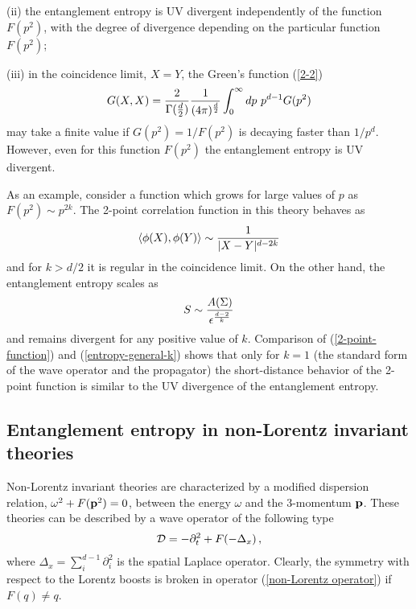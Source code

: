\documentclass[12pt]{article}
\def\be{\begin{eqnarray}}
\def\ee{\end{eqnarray}}
\def\lb{\label}
\def\o{\over}
\begin{document}
\medskip
 
\noindent (ii) the entanglement entropy is UV divergent independently of the function $F(p^2)$, with the degree of divergence 
depending on the particular function $F(p^2)$;

\medskip

\noindent (iii) in the coincidence limit, $X=Y$, the Green's function (\ref{2-2})
\be
G(X,X)={2\o \Gamma({d\o 2})}{1\o (4\pi)^{d\o 2}}\int_0^\infty dp~p^{d-1}G(p^2)
\lb{X=Y}
\ee
may take a finite value if $G(p^2)=1/F(p^2)$ is decaying faster than $1/p^d$. However, even for this function $F(p^2)$ the entanglement entropy is UV divergent.

\medskip

As an example, consider a function which grows for large values of $p$ as $F(p^2)\sim p^{2k}$. 
The   2-point correlation function in this theory behaves as
\be
\langle\phi(X),\phi(Y)\rangle\sim {1\o |X-Y|^{d-2k}}
\lb{2-point-function}
\ee
 and for $k>d/2$ it is regular in the coincidence limit. On the other hand, the entanglement entropy  scales as
 \be
 S\sim {A(\Sigma)\over \epsilon^{d-2\o k}}
 \lb{entropy-general-k}
 \ee
 and remains divergent for any positive value of $k$.  Comparison of (\ref{2-point-function}) and (\ref{entropy-general-k}) shows that only for $k=1$ (the standard form of the wave operator and the propagator) the short-distance behavior of the 2-point function is similar to the UV divergence of the entanglement entropy.

\subsection{Entanglement entropy in   non-Lorentz invariant theories}
\label{subsection: non-Lorentz invariant}

Non-Lorentz invariant theories are characterized by a modified dispersion relation, $\omega^2+F({\bf p}^2)=0$, between the energy $\omega$ and the 3-momentum $\bf p$.
These theories can be described by a wave operator of the following type
\be
{\cal D}=-\partial_t^2+F(-\Delta_x)\, ,
\lb{non-Lorentz operator}
\ee
where $\Delta_x=\sum_i^{d-1}\partial_i^2$ is the spatial Laplace operator. Clearly, the symmetry with respect to the Lorentz boosts is broken in operator (\ref{non-Lorentz operator}) if $F(q)\neq q$. 
\end{document}
